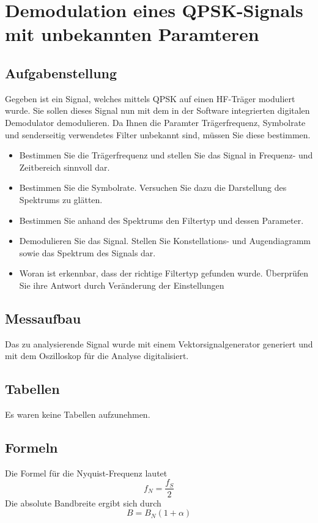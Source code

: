 \documentclass[12pt,a4paper,ngerman]{article}
\begin{document}


%
%

\section{Demodulation eines QPSK-Signals mit unbekannten Paramteren}
\subsection{Aufgabenstellung}
Gegeben ist ein Signal, welches mittels QPSK auf einen HF-Träger moduliert wurde. Sie sollen dieses Signal nun mit dem in der Software integrierten digitalen Demodulator demodulieren. Da Ihnen die Paramter Trägerfrequenz, Symbolrate und senderseitig verwendetes Filter unbekannt sind, müssen Sie diese bestimmen.
\begin{itemize}
\item Bestimmen Sie die Trägerfrequenz und stellen Sie das Signal in Frequenz- und Zeitbereich sinnvoll dar. 
\item Bestimmen Sie die Symbolrate. Versuchen Sie dazu die Darstellung des Spektrums zu glätten.
\item Bestimmen Sie anhand des Spektrums den Filtertyp und dessen Parameter.
\item Demodulieren Sie das Signal. Stellen Sie Konstellations- und Augendiagramm sowie das Spektrum des Signals dar. 
\item Woran ist erkennbar, dass der richtige Filtertyp gefunden wurde. Überprüfen Sie ihre Antwort durch Veränderung der Einstellungen
\end{itemize}
\subsection{Messaufbau}
Das zu analysierende Signal wurde mit einem Vektorsignalgenerator generiert und mit dem Oszilloskop für die Analyse digitalisiert.  
\subsection{Tabellen}
Es waren keine Tabellen aufzunehmen. 
\subsection{Formeln}
Die Formel für die Nyquist-Frequenz lautet
\begin{equation}
f_N = \frac{f_S}{2}
\end{equation}
Die absolute Bandbreite ergibt sich durch
\begin{equation}
B = B_N (1+\alpha)
\end{equation}
\pagebreak
\end{document}
